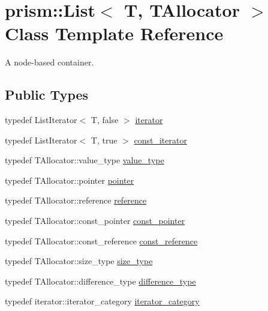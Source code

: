 \hypertarget{classprism_1_1_list}{}\section{prism\+:\+:List$<$ T, T\+Allocator $>$ Class Template Reference}
\label{classprism_1_1_list}


A node-\/based container.  


\subsection*{Public Types}
\begin{DoxyCompactItemize}
\item 
typedef List\+Iterator$<$ T, false $>$ \hyperlink{classprism_1_1_list_a32f6b5634a5aabc496ccb652eb22c490}{iterator}
\item 
typedef List\+Iterator$<$ T, true $>$ \hyperlink{classprism_1_1_list_aafd1fe9c849b0369c3bf7bb0d456e0a3}{const\+\_\+iterator}
\item 
typedef T\+Allocator\+::value\+\_\+type \hyperlink{classprism_1_1_list_a3e9cab77c935e6bc2e96bcb00006382e}{value\+\_\+type}
\item 
typedef T\+Allocator\+::pointer \hyperlink{classprism_1_1_list_ac9c2d25c50b4ebfb02687eeb4e9668bc}{pointer}
\item 
typedef T\+Allocator\+::reference \hyperlink{classprism_1_1_list_a87113fe9cf2580e395e3d9f2962f4e81}{reference}
\item 
typedef T\+Allocator\+::const\+\_\+pointer \hyperlink{classprism_1_1_list_adf013407d4299ad4a1ca8db6e8d7c16e}{const\+\_\+pointer}
\item 
typedef T\+Allocator\+::const\+\_\+reference \hyperlink{classprism_1_1_list_aa263682b12cb5ca200c1b30f85fac524}{const\+\_\+reference}
\item 
typedef T\+Allocator\+::size\+\_\+type \hyperlink{classprism_1_1_list_a1dbc0ff68e25381f32639b7ba2ba390d}{size\+\_\+type}
\item 
typedef T\+Allocator\+::difference\+\_\+type \hyperlink{classprism_1_1_list_a02ec6617f6c1782af39c85431c6803ab}{difference\+\_\+type}
\item 
typedef iterator\+::iterator\+\_\+category \hyperlink{classprism_1_1_list_a9cf5f64f0fa1227312b12929dd87aa8d}{iterator\+\_\+category}
\end{DoxyCompactItemize}
